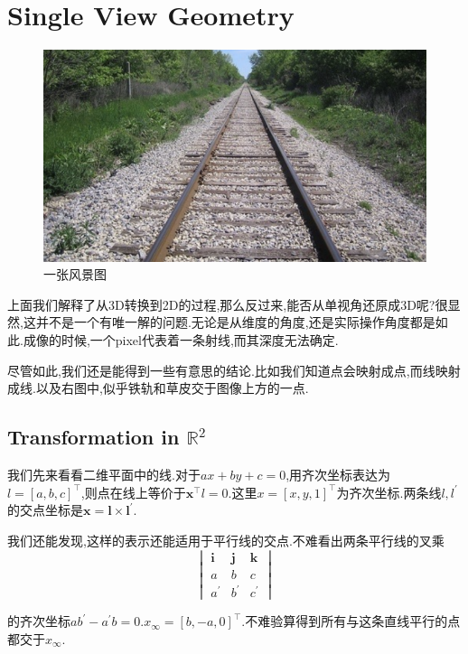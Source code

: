 \section{Single View Geometry}
\begin{figure}
	\includegraphics[scale=0.35]{figures/pic_1.png}
	\caption{一张风景图}
\end{figure}
上面我们解释了从3D转换到2D的过程,那么反过来,能否从单视角还原成3D呢?很显然,这并不是一个有唯一解的问题.无论是从维度的角度,还是实际操作角度都是如此.成像的时候,一个pixel代表着一条射线,而其深度无法确定.

尽管如此,我们还是能得到一些有意思的结论.比如我们知道点会映射成点,而线映射成线.以及右图中,似乎铁轨和草皮交于图像上方的一点.


\subsection{Transformation in $\mathbb R^2$}

我们先来看看二维平面中的线.对于$ax+by+c = 0$,用齐次坐标表达为$l = [a, b, c]^\top$,则点在线上等价于$\bm x^\top l = 0$.这里$x = [x, y, 1]^\top$为齐次坐标.两条线$l, l^\prime$的交点坐标是$\bm x = \bm l \times \bm l^\prime$.

我们还能发现,这样的表示还能适用于平行线的交点.不难看出两条平行线的叉乘
\begin{equation}
	\begin{vmatrix}
		\bm i & \bm j &\bm k
		\\
		a & b & c
		\\
		a^\prime & b^\prime & c^\prime
	\end{vmatrix}
\end{equation}

的齐次坐标$ab^\prime - a^\prime b = 0$.$x_\infty = [b, -a, 0]^\top$.不难验算得到所有与这条直线平行的点都交于$x_\infty$.


